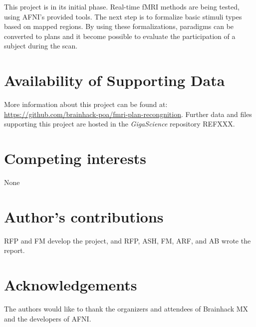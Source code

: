 \documentclass[twocolumn]{bmcart}%
\begin{document}
This project is in its initial phase. Real-time fMRI methods are being
tested, using AFNI's provided tools. The next step is to formalize basic
stimuli types based on mapped regions. By using these formalizations,
paradigms can be converted to plans and it become possible to evaluate
the participation of a subject during the scan.


\begin{backmatter}

\section*{Availability of Supporting Data}
More information about this project can be found at: \url{https://github.com/brainhack-poa/fmri-plan-recongnition}. Further data and files supporting this project are hosted in the \emph{GigaScience} repository REFXXX.

\section*{Competing interests}
None

\section*{Author's contributions}
RFP and FM develop the project, and RFP, ASH, FM, ARF, and AB wrote the
report.

\section*{Acknowledgements}
The authors would like to thank the organizers and attendees of
Brainhack MX and the developers of AFNI.

  
  


\end{backmatter}
\end{document}
